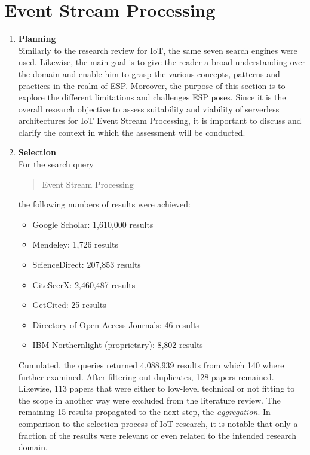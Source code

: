 \section{Event Stream Processing}

\begin{enumerate}
    \item
    \textbf{Planning}\\
    Similarly to the research review for \acf{IoT}, the same seven search engines were used. Likewise, the main goal is to give the reader a broad understanding over the domain and enable him to grasp the various concepts, patterns and practices in the realm of \acf{ESP}. Moreover, the purpose of this section is to explore the different limitations and challenges \acf{ESP} poses. Since it is the overall research objective to assess suitability and viability of serverless architectures for IoT Event Stream Processing, it is important to discuss and clarify the context in which the assessment will be conducted. 
    
    \item
    \textbf{Selection}\\
    For the search query \blockquote{Event Stream Processing} the following numbers of results were achieved:
    
    \begin{itemize}
        \renewcommand\labelitemi{--}
        \item Google Scholar:  1,610,000 results
        \item Mendeley: 1,726 results
        \item ScienceDirect: 207,853 results
        \item CiteSeerX: 2,460,487 results
        \item GetCited: 25 results
        \item Directory of Open Access Journals: 46 results
        \item IBM Northernlight (proprietary): 8,802  results
    \end{itemize}
    
    Cumulated, the queries returned 4,088,939 results from which 140 where further examined. After filtering out duplicates, 128 papers remained. Likewise, 113 papers that were either to low-level technical or not fitting to the scope in another way were excluded from the literature review. The remaining 15 results propagated to the next step, the \textit{aggregation}. In comparison to the selection process of IoT research, it is notable that only a fraction of the results were relevant or even related to the intended research domain.
    

\end{enumerate}
